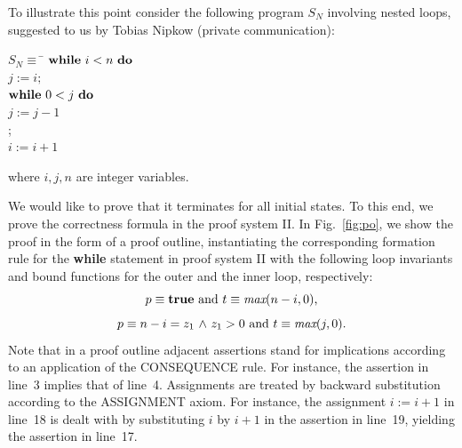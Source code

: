 \documentclass[manuscript, screen, review]{acmart}
\begin{document}
To illustrate this point consider the following program $S_N$ involving nested
loops, suggested to us by Tobias Nipkow (private communication):

\begin{tabbing}
\qquad\qquad
$S_N \equiv$ \= $\mbox{$\mbox{{\bf while}\ } {i < n}\ \mbox{{\bf do}\ }$}$           \\
\> \qquad $j:=i; $                     \\
\> \qquad $\mbox{$\mbox{{\bf while}\ } {0 < j}\ \mbox{{\bf do}\ }$}$                 \\
\> \qquad \qquad $j:=j-1$              \\
\> \qquad \OD ;                        \\
\> \qquad $i:=i+1$                     \\
\> \OD                                               
\end{tabbing}
\noindent
where $i, j, n$ are integer variables. 

\III

We would like to prove that it terminates
for all initial states. To this end, we prove the correctness formula
 in the proof system II.
In Fig.~\ref{fig:po}, we show the proof in the form of a proof outline,
instantiating the corresponding formation rule for the \textbf{while} statement in proof system II
with the following loop invariants and bound functions for the outer and the inner loop, respectively:                                                  \\
\[
  \mbox{$p \equiv \mbox{{\bf true}}$ and $t \equiv  \mbox{\it max}(n-i,0)$,}
\]
\[
  \mbox{$p \equiv  n-i = z_1 \mbox{$\ \wedge\ $} z_1>0$ and $t \equiv \mbox{\it max}(j,0)$.}
\]
Note that in a proof outline adjacent assertions stand for implications
according to an application of the CONSEQUENCE rule.
For instance, the assertion in line~3 implies that of line~4.
Assignments are treated by backward substitution according to the ASSIGNMENT axiom.
For instance, the assignment $i:=i+1$ in line~18 is dealt with by 
substituting $i$ by $i+1$ in the assertion in line~19, yielding
the assertion in line~17.
\end{document}
